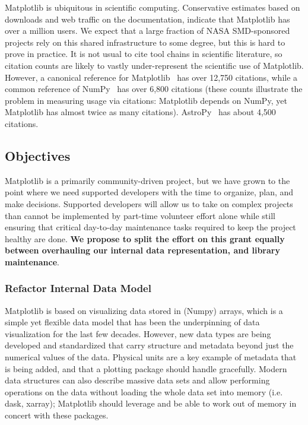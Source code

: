 \documentclass[12pt]{article}
\numberwithin{page}{section}
\begin{document}
Matplotlib is ubiquitous in scientific computing.  Conservative estimates based on downloads and web traffic on the documentation, indicate that Matplotlib has over a
million users.  We expect that a large fraction of NASA SMD-sponsored
projects rely on this shared infrastructure to some degree, but this
is hard to prove in practice.  It is not usual to cite tool chains in scientific literature, so citation counts are likely to
vastly under-represent the scientific use of Matplotlib.  However, a
canonical reference for Matplotlib~\cite{Hunter:2007} has over 12,750
citations, while a common reference of NumPy~\cite{walt2011numpy} has
over 6,800 citations (these counts illustrate the problem in
measuring usage via citations: Matplotlib depends on
NumPy, yet Matplotlib has almost twice as many citations).
AstroPy~\cite{robitaille2013astropy} has about 4,500 citations.

\subsection{Objectives}





Matplotlib is a primarily community-driven project, but we have grown
to the point where we need supported developers with the time to
organize, plan, and make decisions.  Supported developers will allow
us to take on complex projects than cannot be implemented by part-time
volunteer effort alone while still ensuring that critical day-to-day
maintenance tasks required to keep the project healthy are done.
\textbf{We propose to split the effort on this grant equally between
  overhauling our internal data representation, and library
  maintenance}.


\subsubsection{Refactor Internal Data Model}
\label{sec:ridm}

Matplotlib is based on visualizing data stored in (Numpy) arrays,
which is a simple yet flexible data model that has been the
underpinning of data visualization for the last few decades.  However,
new data types are being developed and standardized that carry
structure and metadata beyond just the numerical values of the data.
Physical units are a key example of metadata that is being added, and
that a plotting package should handle gracefully.  Modern data
structures can also describe massive data sets and allow performing
operations on the data without loading the whole data set into memory
(i.e. dask, xarray); Matplotlib should leverage and be able to work
out of memory in concert with these packages.
\end{document}
